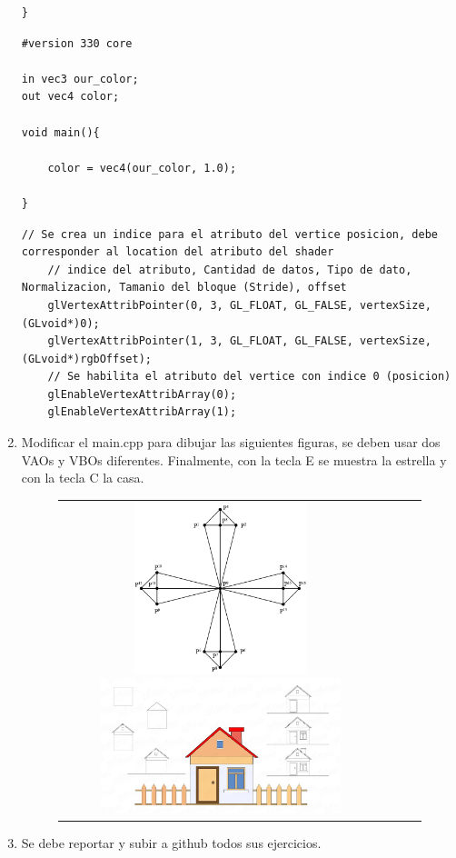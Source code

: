\documentclass[11pt, english]{article}
\begin{document}
\begin{enumerate}
\begin{lstlisting}[label={list:six},caption={Vertex Shader.}, style=customc]
}

\end{lstlisting}

\begin{lstlisting}[label={list:seven},caption={Fragment Shader.}, style=customc]
#version 330 core

in vec3 our_color;
out vec4 color;

void main(){
	
	color = vec4(our_color, 1.0);

}
\end{lstlisting}

\begin{lstlisting}[label={list:eight},caption={Linkeo de los atributos.}, style=customc]
	// Se crea un indice para el atributo del vertice posicion, debe corresponder al location del atributo del shader
	// indice del atributo, Cantidad de datos, Tipo de dato, Normalizacion, Tamanio del bloque (Stride), offset
	glVertexAttribPointer(0, 3, GL_FLOAT, GL_FALSE, vertexSize, (GLvoid*)0);
	glVertexAttribPointer(1, 3, GL_FLOAT, GL_FALSE, vertexSize, (GLvoid*)rgbOffset);
	// Se habilita el atributo del vertice con indice 0 (posicion)
	glEnableVertexAttribArray(0);
	glEnableVertexAttribArray(1);
\end{lstlisting}

\item Modificar el main.cpp para dibujar las siguientes
figuras, se deben usar dos VAOs y VBOs diferentes. Finalmente, con la tecla E
se muestra la estrella y con la tecla C la casa.
\begin{figure}[htb]
\begin{center}
\centering
\begin{tabular}{@{}cccc@{}}
\includegraphics[width=5cm]{images/Estrella.png}
\hspace*{0.3in}
\includegraphics[width=7cm]{images/Casa.png}
\end{tabular}
\end{center}
\end{figure}
\item Se debe reportar y subir a github todos sus ejercicios.
\end{enumerate}
\end{document}
